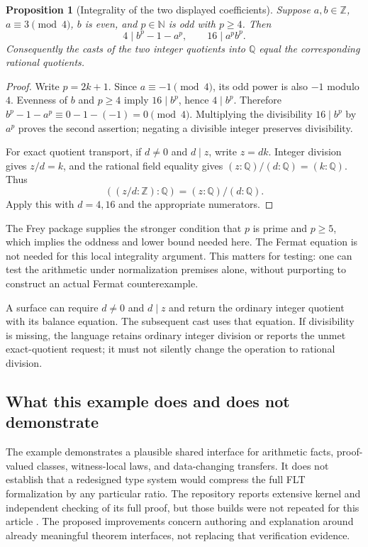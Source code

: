 \documentclass[11pt,letterpaper]{article}
\newcommand{\code}[1]{\texttt{\detokenize{#1}}}
\newcommand{\N}{\mathbb N}
\newcommand{\Z}{\mathbb Z}
\newcommand{\Q}{\mathbb Q}
\newtheorem{proposition}[theorem]{Proposition}
\theoremstyle{definition}
\theoremstyle{remark}
\begin{document}
\begin{proposition}[Integrality of the two displayed coefficients]\label{prop:frey}
Suppose $a,b\in\Z$, $a\equiv3\pmod4$, $b$ is even, and $p\in\N$ is odd with
$p\ge4$. Then
\[
       4\mid b^p-1-a^p,\qquad16\mid a^pb^p.
\]
Consequently the casts of the two integer quotients into $\Q$ equal the
corresponding rational quotients.
\end{proposition}
\begin{proof}
Write $p=2k+1$. Since $a\equiv-1\pmod4$, its odd power is also $-1$ modulo $4$.
Evenness of $b$ and $p\ge4$ imply $16\mid b^p$, hence $4\mid b^p$.
Therefore $b^p-1-a^p\equiv0-1-(-1)=0\pmod4$. Multiplying the divisibility
$16\mid b^p$ by $a^p$ proves the second assertion; negating a divisible integer
preserves divisibility.

For exact quotient transport, if $d\ne0$ and $d\mid z$, write $z=dk$. Integer
division gives $z/d=k$, and the rational field equality gives
$(z:\Q)/(d:\Q)=(k:\Q)$. Thus
\[
             ((z/d:\Z):\Q)=(z:\Q)/(d:\Q).
\]
Apply this with $d=4,16$ and the appropriate numerators.
\end{proof}
The Frey package supplies the stronger condition that $p$ is prime and $p\ge5$,
which implies the oddness and lower bound needed here. The Fermat equation is
not needed for this local integrality argument. This matters for testing: one
can test the arithmetic under normalization premises alone, without purporting
to construct an actual Fermat counterexample.

A surface \code{exact quotient z by d} can require $d\ne0$ and $d\mid z$ and
return the ordinary integer quotient with its balance equation. The subsequent
cast uses that equation. If divisibility is missing, the language retains
ordinary integer division or reports the unmet exact-quotient request; it must
not silently change the operation to rational division.

\subsection{What this example does and does not demonstrate}
The example demonstrates a plausible shared interface for arithmetic facts,
proof-valued classes, witness-local laws, and data-changing transfers. It does
not establish that a redesigned type system would compress the full FLT
formalization by any particular ratio. The repository reports extensive kernel
and independent checking of its full proof, but those builds were not repeated
for this article \cite{flt-readme}. The proposed improvements concern authoring
and explanation around already meaningful theorem interfaces, not replacing
that verification evidence.
\end{document}
